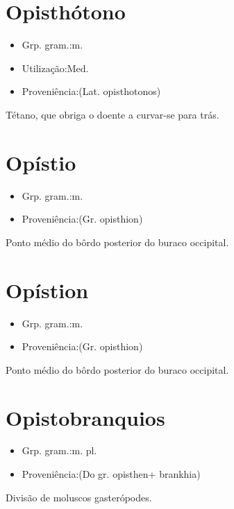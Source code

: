 \section{Opisthótono}
\begin{itemize}
\item {Grp. gram.:m.}
\end{itemize}
\begin{itemize}
\item {Utilização:Med.}
\end{itemize}
\begin{itemize}
\item {Proveniência:(Lat. \textunderscore opisthotonos\textunderscore )}
\end{itemize}
Tétano, que obriga o doente a curvar-se para trás.
\section{Opístio}
\begin{itemize}
\item {Grp. gram.:m.}
\end{itemize}
\begin{itemize}
\item {Proveniência:(Gr. \textunderscore opisthion\textunderscore )}
\end{itemize}
Ponto médio do bôrdo posterior do buraco occipital.
\section{Opístion}
\begin{itemize}
\item {Grp. gram.:m.}
\end{itemize}
\begin{itemize}
\item {Proveniência:(Gr. \textunderscore opisthion\textunderscore )}
\end{itemize}
Ponto médio do bôrdo posterior do buraco occipital.
\section{Opistobranquios}
\begin{itemize}
\item {Grp. gram.:m. pl.}
\end{itemize}
\begin{itemize}
\item {Proveniência:(Do gr. \textunderscore opisthen\textunderscore  + \textunderscore brankhia\textunderscore )}
\end{itemize}
Divisão de moluscos gasterópodes.
